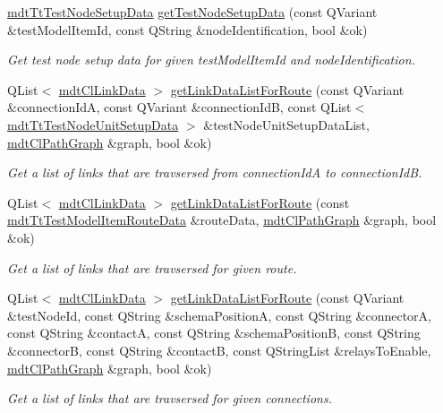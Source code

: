 \begin{DoxyCompactItemize}
\hyperlink{classmdt_tt_test_node_setup_data}{mdt\-Tt\-Test\-Node\-Setup\-Data} \hyperlink{classmdt_tt_test_a2e94f9328bb623b7132ad5cfcf2e0eb2}{get\-Test\-Node\-Setup\-Data} (const Q\-Variant \&test\-Model\-Item\-Id, const Q\-String \&node\-Identification, bool \&ok)
\begin{DoxyCompactList}\small\item\em Get test node setup data for given test\-Model\-Item\-Id and node\-Identification. \end{DoxyCompactList}\item 
Q\-List$<$ \hyperlink{classmdt_cl_link_data}{mdt\-Cl\-Link\-Data} $>$ \hyperlink{classmdt_tt_test_a714c75cac12f6ed3f14bd69ffa59b02f}{get\-Link\-Data\-List\-For\-Route} (const Q\-Variant \&connection\-Id\-A, const Q\-Variant \&connection\-Id\-B, const Q\-List$<$ \hyperlink{classmdt_tt_test_node_unit_setup_data}{mdt\-Tt\-Test\-Node\-Unit\-Setup\-Data} $>$ \&test\-Node\-Unit\-Setup\-Data\-List, \hyperlink{classmdt_cl_path_graph}{mdt\-Cl\-Path\-Graph} \&graph, bool \&ok)
\begin{DoxyCompactList}\small\item\em Get a list of links that are travsersed from connection\-Id\-A to connection\-Id\-B. \end{DoxyCompactList}\item 
Q\-List$<$ \hyperlink{classmdt_cl_link_data}{mdt\-Cl\-Link\-Data} $>$ \hyperlink{classmdt_tt_test_a0f63e5cea734f6cc8b95fcb23062d1ed}{get\-Link\-Data\-List\-For\-Route} (const \hyperlink{classmdt_tt_test_model_item_route_data}{mdt\-Tt\-Test\-Model\-Item\-Route\-Data} \&route\-Data, \hyperlink{classmdt_cl_path_graph}{mdt\-Cl\-Path\-Graph} \&graph, bool \&ok)
\begin{DoxyCompactList}\small\item\em Get a list of links that are travsersed for given route. \end{DoxyCompactList}\item 
Q\-List$<$ \hyperlink{classmdt_cl_link_data}{mdt\-Cl\-Link\-Data} $>$ \hyperlink{classmdt_tt_test_a56f7d773428b273c2f0c11704071e288}{get\-Link\-Data\-List\-For\-Route} (const Q\-Variant \&test\-Node\-Id, const Q\-String \&schema\-Position\-A, const Q\-String \&connector\-A, const Q\-String \&contact\-A, const Q\-String \&schema\-Position\-B, const Q\-String \&connector\-B, const Q\-String \&contact\-B, const Q\-String\-List \&relays\-To\-Enable, \hyperlink{classmdt_cl_path_graph}{mdt\-Cl\-Path\-Graph} \&graph, bool \&ok)
\begin{DoxyCompactList}\small\item\em Get a list of links that are travsersed for given connections. \end{DoxyCompactList}\item 

\end{DoxyCompactItemize}
